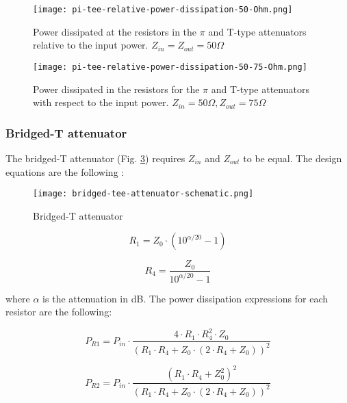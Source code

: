 \begin{figure}[ht]
    \centering
    \texttt{[image: pi-tee-relative-power-dissipation-50-Ohm.png]}
    \caption{Power dissipated at the resistors in the $\pi$ and T-type attenuators relative to the input power. $Z_{in} = Z_{out} = 50 \Omega$}
    \label{fig:pi-tee-relative-power-dissipation-50-Ohm}
\end{figure}

\begin{figure}[ht]
    \centering
    \texttt{[image: pi-tee-relative-power-dissipation-50-75-Ohm.png]}
    \caption{Power dissipated in the resistors for the $\pi$ and T-type attenuators with respect to the input power. $Z_{in} = 50 \Omega, Z_{out} = 75 \Omega$}
    \label{fig:pi-tee-relative-power-dissipation-50-75-Ohm}
\end{figure}

\subsubsection{Bridged-T attenuator}

\noindent The bridged-T attenuator (Fig. \ref{fig:bridged-tee-attenuator-schematic}) requires $Z_{in}$ and $Z_{out}$ to be equal. The design equations are the following \cite{vizmuller1995rf}:

\begin{figure}[ht]
    \centering
    \texttt{[image: bridged-tee-attenuator-schematic.png]}
    \caption{Bridged-T attenuator}
    \label{fig:bridged-tee-attenuator-schematic}
\end{figure}

\begin{equation}
    R_1 = Z_0 \cdot (10^{\alpha/20} - 1)
\end{equation}

\begin{equation}
    R_4 = \frac{Z_0}{10^{\alpha/20} - 1}
\end{equation}

\noindent where $\alpha$ is the attenuation in dB. The power dissipation expressions for each resistor are the following:

\begin{equation}
    P_{R1} = P_{in} \cdot \frac{4 \cdot R_1 \cdot R_4^2 \cdot Z_0}{(R_1 \cdot R_4 + Z_0 \cdot (2 \cdot R_4 + Z_0))^2}
\end{equation}

\begin{equation}
    P_{R2} = P_{in} \cdot \frac{(R_1 \cdot R_4 + Z_0^2)^2}{(R_1 \cdot R_4 + Z_0 \cdot (2 \cdot R_4 + Z_0))^2}
\end{equation}


